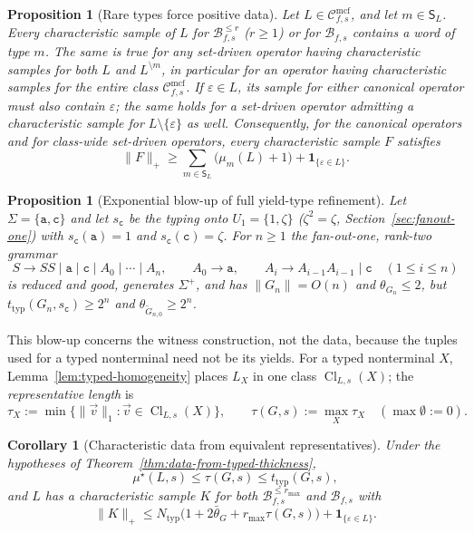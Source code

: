 \documentclass[11pt]{article}
\numberwithin{equation}{section}
\theoremstyle{plain}
\newtheorem{proposition}[theorem]{Proposition}
\newtheorem{corollary}[theorem]{Corollary}
\theoremstyle{definition}
\theoremstyle{remark}
\newcommand{\Cmcf}[2]{\mathcal{C}^{\mathrm{mcf}}_{#1,#2}}
\newcommand{\tuple}[1]{\vec{#1}}
\newcommand{\eps}{\varepsilon}
\theoremstyle{plain}
\begin{document}
\begin{proposition}[Rare types force positive data]
\label{prop:rare-type}
Let $L\in\Cmcf{f}{s}$, and let $m\in \mathsf S_L$.
Every characteristic sample of $L$ for
$\mathcal B^{\le r}_{f,s}$ ($r\ge1$) or for $\mathcal B_{f,s}$
contains a word of type $m$. The same is true for any set-driven
operator having characteristic samples for both $L$ and
$L^{\setminus m}$, in particular for an operator having
characteristic samples for the entire class $\Cmcf{f}{s}$.
If $\eps\in L$, its sample for either canonical operator must
also contain $\eps$; the same holds for a set-driven operator admitting
a characteristic sample for $L\setminus\{\eps\}$ as well.
Consequently, for the canonical operators and for class-wide
set-driven operators, every characteristic sample $F$ satisfies
\[
 \|F\|_+\ge
 \sum_{m\in \mathsf S_L}\bigl(\mu_m(L)+1\bigr)
 +\mathbf 1_{\{\eps\in L\}}.
\]
\end{proposition}

\begin{proposition}[Exponential blow-up of full yield-type refinement]
\label{prop:typed-thickness-exponential}
Let $\Sigma=\{\mathtt a,\mathtt c\}$ and let $s_{\mathtt c}$ be the typing onto
$U_1=\{1,\zeta\}$ ($\zeta^2=\zeta$, Section~\ref{sec:fanout-one}) with $s_{\mathtt c}(\mathtt a)=1$ and
$s_{\mathtt c}(\mathtt c)=\zeta$.  For $n\ge1$ the fan-out-one, rank-two grammar
\[
 S\to SS\mid\mathtt a\mid\mathtt c\mid A_0\mid\cdots\mid A_n,\qquad
 A_0\to\mathtt a,\qquad
 A_i\to A_{i-1}A_{i-1}\mid\mathtt c\quad(1\le i\le n)
\]
is reduced and good, generates $\Sigma^+$, and has $\|G_n\|=O(n)$ and
$\theta_{G_n}\le2$, but $t_{\mathrm{typ}}(G_n,s_{\mathtt c})\ge2^n$ and
$\theta_{\widetilde G_{n,0}}\ge2^n$.
\end{proposition}

This blow-up concerns the witness construction, not the data, because the
tuples used for a typed nonterminal need not be its yields.  For a typed
nonterminal $X$, Lemma~\ref{lem:typed-homogeneity} places $L_X$ in one class
$\operatorname{Cl}_{L,s}(X)$; the \emph{representative length} is
\[
 \tau_X:=\min\{\|\tuple v\|_1:\tuple v\in\operatorname{Cl}_{L,s}(X)\},\qquad
 \tau(G,s):=\max_X\tau_X\quad(\max\emptyset:=0).
\]

\begin{corollary}[Characteristic data from equivalent representatives]
\label{cor:distribution-representatives}
Under the hypotheses of Theorem~\ref{thm:data-from-typed-thickness},
\[
 \mu^\star(L,s)\le\tau(G,s)\le t_{\mathrm{typ}}(G,s),
\]
and $L$ has a characteristic sample $K$ for both
$\mathcal B^{\le r_{\max}}_{f,s}$ and $\mathcal B_{f,s}$ with
\[
 \|K\|_+\le N_{\mathrm{typ}}\bigl(1+2\bar\theta_G+r_{\max}\tau(G,s)\bigr)
 +\mathbf 1_{\{\eps\in L\}}.
\]
\end{corollary}
\end{document}

